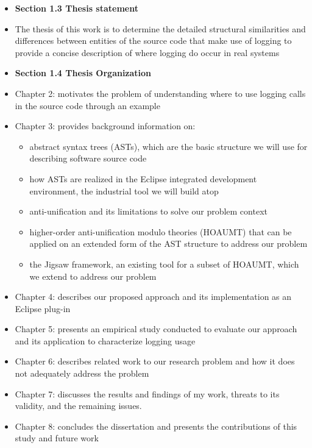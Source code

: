 \documentclass{article}
\newcommand{\bold}{\textbf}
\begin{document}
\begin{itemize} [leftmargin=.1in]
\item \bold{Section 1.3 Thesis statement}
\item The thesis of this work is to determine the detailed structural similarities and differences between entities of the source code that make use of logging to provide a concise description of where logging do occur in real systems

\item \bold{Section 1.4 Thesis Organization}
\item Chapter 2: motivates the problem of understanding where to use logging calls in the source code through an example%
\item Chapter 3: provides background information on:
\begin{itemize}
\item abstract syntax trees (ASTs), which are the basic structure we will use for describing software source code
\item how ASTs are realized in the Eclipse integrated development environment, the industrial tool we will build atop
\item anti-unification and its limitations to solve our problem context
\item higher-order anti-unification modulo theories (HOAUMT) that can be applied on an extended form of the AST structure to address our problem
\item the Jigsaw framework, an existing tool for a subset of HOAUMT, which we extend to address our problem
\end{itemize}
\item Chapter 4: describes our proposed approach and its implementation as an Eclipse plug-in
\item Chapter 5: presents an empirical study conducted to evaluate our approach and its application to characterize logging usage
\item Chapter 6: describes related work to our research problem and how it
does not adequately address the problem
\item Chapter 7: discusses the results and findings of my work, threats to its validity, and the remaining issues.
\item Chapter 8: concludes the dissertation and presents the contributions of this study and future work


\end{itemize}
\end{document}
